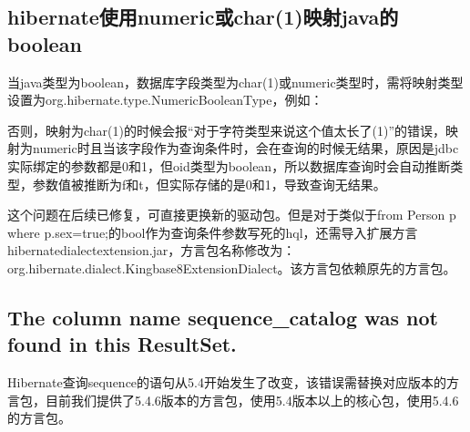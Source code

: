 \documentclass[a4,10pt,oneside,english]{sphinxmanual}
\begin{document}
\begin{sphinxVerbatim}[commandchars=\\\{\}]
 
\end{sphinxVerbatim}


\subsection{hibernate使用numeric或char(1)映射java的boolean}
\label{\detokenize{interface/hibernate:hibernatenumericchar-1-javaboolean}}
当java类型为boolean，数据库字段类型为char(1)或numeric类型时，需将映射类型设置为org.hibernate.type.NumericBooleanType，例如：

\begin{sphinxVerbatim}[commandchars=\\\{\}]
  
          
\end{sphinxVerbatim}

否则，映射为char(1)的时候会报“对于字符类型来说这个值太长了(1)”的错误，映射为numeric时且当该字段作为查询条件时，会在查询的时候无结果，原因是jdbc实际绑定的参数都是0和1，但oid类型为boolean，所以数据库查询时会自动推断类型，参数值被推断为f和t，但实际存储的是0和1，导致查询无结果。

这个问题在后续已修复，可直接更换新的驱动包。但是对于类似于from Person p where p.sex=true;的bool作为查询条件参数写死的hql，还需导入扩展方言hibernate\sphinxhyphen{}dialect\sphinxhyphen{}extension.jar，方言包名称修改为：org.hibernate.dialect.Kingbase8ExtensionDialect。该方言包依赖原先的方言包。


\subsection{The column name sequence\_catalog was not found in this ResultSet.}
\label{\detokenize{interface/hibernate:the-column-name-sequence-catalog-was-not-found-in-this-resultset}}
Hibernate查询sequence的语句从5.4开始发生了改变，该错误需替换对应版本的方言包，目前我们提供了5.4.6版本的方言包，使用5.4版本以上的核心包，使用5.4.6的方言包。
\end{document}
